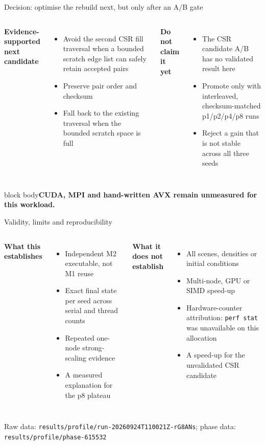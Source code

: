\documentclass[aspectratio=169,10pt]{beamer}
\newcommand{\claim}[1]{\begin{beamercolorbox}[rounded=true,sep=.65em,wd=\linewidth]{block body}\centering\bfseries\color{moss}#1\end{beamercolorbox}}
\newcommand{\smallsource}[1]{\vfill\hfill{\scriptsize\color{muted}#1}}
\begin{document}
\begin{frame}{Decision: optimise the rebuild next, but only after an A/B gate}
\begin{columns}[T,onlytextwidth]
\textbf{Evidence-supported next candidate}
\begin{itemize}\itemsep.25em
  \item Avoid the second CSR fill traversal when a bounded scratch edge list can safely retain accepted pairs
  \item Preserve pair order and checksum
  \item Fall back to the existing traversal when the bounded scratch space is full
\end{itemize}
\textbf{Do not claim it yet}
\begin{itemize}\itemsep.25em
  \item The CSR candidate A/B has no validated result here
  \item Promote only with interleaved, checksum-matched p1/p2/p4/p8 runs
  \item Reject a gain that is not stable across all three seeds
\end{itemize}
\end{columns}
\vspace{.25em}
\claim{CUDA, MPI and hand-written AVX remain unmeasured for this workload.}
\end{frame}

\begin{frame}{Validity, limits and reproducibility}
\begin{columns}[T,onlytextwidth]
\textbf{What this establishes}
\begin{itemize}\itemsep.35em
  \item Independent M2 executable, not M1 reuse
  \item Exact final state per seed across serial and thread counts
  \item Repeated one-node strong-scaling evidence
  \item A measured explanation for the p8 plateau
\end{itemize}
\textbf{What it does not establish}
\begin{itemize}\itemsep.35em
  \item All scenes, densities or initial conditions
  \item Multi-node, GPU or SIMD speed-up
  \item Hardware-counter attribution: \texttt{perf stat} was unavailable on this allocation
  \item A speed-up for the unvalidated CSR candidate
\end{itemize}
\end{columns}
\vspace{.7em}
\smallsource{Raw data: \texttt{results/profile/run-20260924T110021Z-rG8ANs}; phase data: \texttt{results/profile/phase-615532}}
\end{frame}
\end{document}
